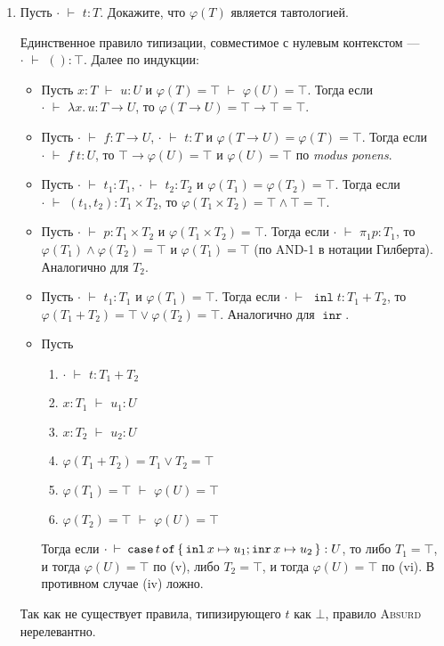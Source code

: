 \documentclass{article}
\DeclareMathOperator{\tinl}{\mathtt{inl}}
\DeclareMathOperator{\tinr}{\mathtt{inr}}
\DeclareMathOperator{\tcase}{\mathtt{case}}
\DeclareMathOperator{\tof}{\mathtt{of}}
\DeclareMathOperator{\tstl}{\ \vdash\ }
\begin{document}
\begin{enumerate}
\begin{enumerate}
        \item Пусть $\cdot\tstl t:T$. Докажите, что $\varphi(T)$ является тавтологией.
        
        \begin{mdframed}
            Единственное правило типизации, совместимое с нулевым контекстом — $\cdot\tstl():\top$. Далее по индукции:
            \begin{itemize}
                \item Пусть $x: T\tstl u: U$ и $\varphi(T) = \top \tstl \varphi(U) = \top$. Тогда если $\cdot\tstl \lambda x.\,u : T\to U$, то $\varphi(T\to U) = \top \to \top = \top$.
                \item Пусть $\cdot\tstl f:T\to U$, $\cdot \tstl t: T$ и $\varphi(T\to U) = \varphi (T) = \top$. Тогда если $\cdot \tstl f\ t:U$, то $\top\to\varphi(U) = \top$ и $\varphi(U)=\top$ по \textit{modus ponens}.
                \item Пусть $\cdot \tstl t_1: T_1$, $\cdot \tstl t_2: T_2$ и $\varphi(T_1)=\varphi(T_2)=\top$. Тогда если $\cdot \tstl (t_1,t_2): T_1\times T_2$, то $\varphi(T_1 \times T_2) = \top \land \top = \top$.
                \item Пусть $\cdot \tstl p: T_1\times T_2$ и $\varphi(T_1\times T_2)=\top$. Тогда если $\cdot \tstl \pi_1 p: T_1$, то $\varphi(T_1)\land\varphi(T_2) = \top$ и $\varphi(T_1) = \top$ (по AND-1 в нотации Гилберта). Аналогично для $T_2$.
                \item Пусть $\cdot \tstl t_1: T_1$ и $\varphi(T_1)=\top$. Тогда если $\cdot \tstl \tinl t: T_1 + T_2$, то $\varphi(T_1 + T_2) = \top \lor \varphi(T_2) = \top$. Аналогично для $\tinr$.
                \item Пусть 
                \begin{enumerate}
                    \item $\cdot \tstl t: T_1 + T_2$
                    \item $x:T_1 \tstl u_1: U$
                    \item $x:T_2 \tstl u_2: U$
                    \item $\varphi(T_1 + T_2) = T_1\lor T_2 = \top$
                    \item $\varphi(T_1) = \top \tstl \varphi(U) = \top$
                    \item $\varphi(T_2) = \top \tstl \varphi(U) = \top$
                \end{enumerate}
                Тогда если $\cdot \tstl \tcase t \tof \set{\tinl x\mapsto u_1; \tinr x \mapsto u_2}: U$, то либо $T_1 = \top$, и тогда $\varphi(U) = \top$ по (v), либо $T_2 = \top$, и тогда $\varphi(U) = \top$ по (vi). В противном случае (iv) ложно.
            \end{itemize}
            Так как не существует правила, типизирующего $t$ как $\bot$, правило \textsc{Absurd} нерелевантно.
        \end{mdframed}
    \end{enumerate}


\end{enumerate}
\end{document}
